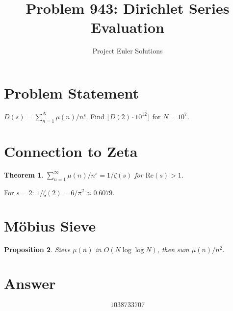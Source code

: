 \documentclass[11pt]{article}
\title{Problem 943: Dirichlet Series Evaluation}
\author{Project Euler Solutions}
\date{}
\newtheorem{theorem}{Theorem}
\newtheorem{proposition}[theorem]{Proposition}
\theoremstyle{definition}
\begin{document}
\maketitle

\section{Problem Statement}
$D(s) = \sum_{n=1}^N \mu(n)/n^s$. Find $\lfloor D(2) \cdot 10^{12} \rfloor$ for $N=10^7$.

\section{Connection to Zeta}
\begin{theorem}
$\sum_{n=1}^\infty \mu(n)/n^s = 1/\zeta(s)$ for $\mathrm{Re}(s) > 1$.
\end{theorem}

For $s=2$: $1/\zeta(2) = 6/\pi^2 \approx 0.6079$.

\section{M\"obius Sieve}
\begin{proposition}
Sieve $\mu(n)$ in $O(N\log\log N)$, then sum $\mu(n)/n^2$.
\end{proposition}

\section{Answer}

\[
\boxed{1038733707}
\]
\end{document}
